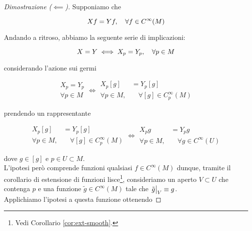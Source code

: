 \begin{proof}[Dimostrazione ($ \impliedby $)]
	Supponiamo che
	
	\begin{equation}
		X f = Y f  \qcomma \forall f \in C^{\infty}(M)
	\end{equation}
	
	Andando a ritroso, abbiamo la seguente serie di implicazioni:
	
	\begin{equation}
		X = Y \iff X_{p} = Y_{p} \qcomma \forall p \in M
	\end{equation}

	considerando l'azione sui germi
	
	\begin{equation}
		\begin{aligned}
			X_{p} = Y_{p} \\
			\forall p \in M
		\end{aligned} %
		 \iff %
		 \begin{aligned}
			 X_{p} [g] &= Y_{p} [g] \\
			 \forall p \in M,& \quad \forall [g] \in C_{p}^{\infty}(M)
		 \end{aligned}
	\end{equation}

	prendendo un rappresentante
	
	\begin{equation}
		\begin{aligned}
			X_{p} [g] &= Y_{p} [g] \\
			\forall p \in M,& \quad \forall [g] \in C_{p}^{\infty}(M)
		\end{aligned}%
		\iff %
		\begin{aligned}
			X_{p} g &= Y_{p} g \\
			\forall p \in M,& \quad \forall g \in C^{\infty}(U)
		\end{aligned}
	\end{equation}
	
	dove $ g \in [g] $ e $ p \in U \subset M $. \\
	L'ipotesi però comprende funzioni qualsiasi $ f \in C^{\infty}(M) $ dunque, tramite il corollario di estensione di funzioni lisce\footnote{%
		Vedi Corollario \ref{cor:ext-smooth}.%
	}, consideriamo un aperto $ V \subset U $ che contenga $ p $ e una funzione $ \tilde{g} \in C^{\infty}(M) $ tale che $ \eval{\tilde{g}}_{V} \equiv g $. \\
	Applichiamo l'ipotesi a questa funzione ottenendo
	

\end{proof}
